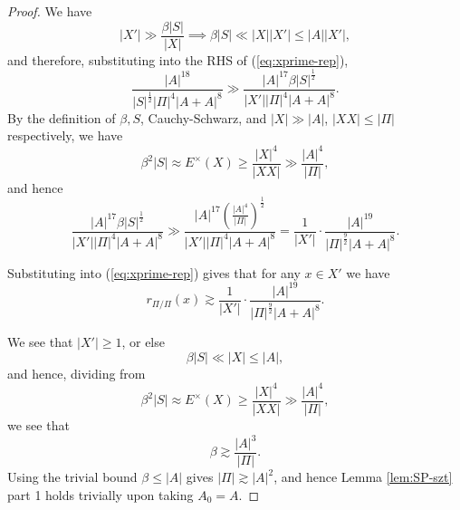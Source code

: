 \documentclass[10pt,a4paper]{amsart}
\begin{document}
\begin{proof}
We have
\[
    \left\lvert X' \right\rvert \gg \frac{\beta \left\lvert S \right\rvert }{\left\lvert X \right\rvert }  \implies \beta \left\lvert S \right\rvert \ll \left\lvert X \right\rvert \left\lvert X' \right\rvert \leq \left\lvert A \right\rvert \left\lvert X' \right\rvert 
,\]
and therefore, substituting into the RHS of (\ref{eq:xprime-rep}),
\[
    \frac{\left\lvert A \right\rvert ^{18}}{\left\lvert S \right\rvert ^{\frac{1}{2} } \left\lvert \Pi \right\rvert ^{4} \left\lvert A + A \right\rvert ^{8}} \gg \frac{\left\lvert A \right\rvert ^{17} \beta \left\lvert S \right\rvert ^{\frac{1}{2} }}{\left\lvert X' \right\rvert \left\lvert \Pi \right\rvert ^{4} \left\lvert A + A \right\rvert ^{8}}
.\]
By the definition of \(\beta , S\), Cauchy-Schwarz, and \(\left\lvert X \right\rvert \gg \left\lvert A \right\rvert \), \(\left\lvert X X \right\rvert \leq \left\lvert \Pi \right\rvert \) respectively, we have
\[
    \beta ^{2} \left\lvert S \right\rvert \approx E^{\times }(X) \geq \frac{\left\lvert X \right\rvert ^{4}}{\left\lvert XX \right\rvert }  \gg \frac{\left\lvert A \right\rvert ^{4}}{\left\lvert \Pi \right\rvert } 
,\]
and hence
\[
    \frac{\left\lvert A \right\rvert ^{17} \beta \left\lvert S \right\rvert ^{\frac{1}{2} }}{\left\lvert X' \right\rvert \left\lvert \Pi \right\rvert ^{4} \left\lvert A + A \right\rvert ^{8}} \gg \frac{\left\lvert A \right\rvert ^{17} \left( \frac{\left\lvert A \right\rvert ^{4}}{\left\lvert \Pi \right\rvert }  \right) ^{\frac{1}{2} }}{\left\lvert X' \right\rvert \left\lvert \Pi \right\rvert ^{4} \left\lvert A + A \right\rvert ^{8}} = \frac{1}{\left\lvert X' \right\rvert } \cdot \frac{\left\lvert A \right\rvert ^{19}}{\left\lvert \Pi \right\rvert ^{\frac{9}{2} }\left\lvert A+A \right\rvert ^{8}}  
.\]

Substituting into (\ref{eq:xprime-rep}) gives that for any \(x \in X'\) we have
\begin{equation} \label{eq:xprime-rep-final}
    r_{ \Pi / \Pi } \left( x  \right)  \gtrsim \frac{1}{\left\lvert X' \right\rvert } \cdot \frac{\left\lvert A \right\rvert ^{19}}{\left\lvert \Pi \right\rvert ^{\frac{9}{2} } \left\lvert A + A \right\rvert ^{8}} .
\end{equation}

We see that \(\left\lvert X' \right\rvert \geq 1\), or else
\[
    \beta \left\lvert S \right\rvert \ll \left\lvert X \right\rvert \leq \left\lvert A \right\rvert 
,\]
and hence, dividing from
\[
    \beta^{2} \left\lvert S \right\rvert \approx E^{\times }(X) \geq \frac{\left\lvert X \right\rvert ^{4}}{\left\lvert XX \right\rvert } \gg \frac{\left\lvert A \right\rvert ^{4}}{\left\lvert \Pi \right\rvert } 
,\]
we see that
\[
    \beta \gtrsim \frac{\left\lvert A \right\rvert ^{3} }{\left\lvert \Pi \right\rvert } 
.\]
Using the trivial bound \(\beta \leq \left\lvert A \right\rvert \) gives
\(\left\lvert \Pi \right\rvert \gtrsim \left\lvert A \right\rvert ^{2}\), and hence Lemma \ref{lem:SP-szt} part 1 holds trivially
upon taking \(A_0 = A\).


\end{proof}
\end{document}
